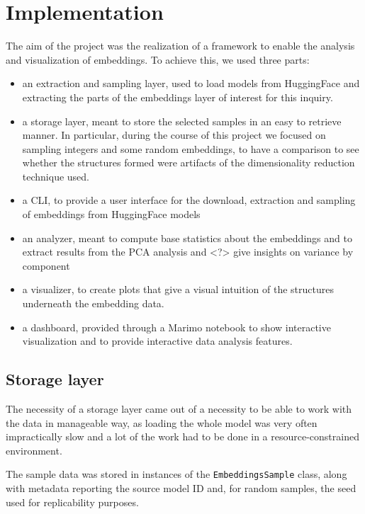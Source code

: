 \documentclass[
  a4paper, twoside, 10pt, titlepage]{book}
\begin{document}
\chapter{Implementation}\label{implementation}

The aim of the project was the realization of a framework to enable the
analysis and visualization of embeddings. To achieve this, we used three
parts:

\begin{itemize}
\item
  an extraction and sampling layer, used to load models from HuggingFace
  and extracting the parts of the embeddings layer of interest for this
  inquiry.
\item
  a storage layer, meant to store the selected samples in an easy to
  retrieve manner. In particular, during the course of this project we
  focused on sampling integers and some random embeddings, to have a
  comparison to see whether the structures formed were artifacts of the
  dimensionality reduction technique used.
\item
  a CLI, to provide a user interface for the download, extraction and
  sampling of embeddings from HuggingFace models
\item
  an analyzer, meant to compute base statistics about the embeddings and
  to extract results from the PCA analysis and \textless?\textgreater{}
  give insights on variance by component
\item
  a visualizer, to create plots that give a visual intuition of the
  structures underneath the embedding data.
\item
  a dashboard, provided through a Marimo notebook to show interactive
  visualization and to provide interactive data analysis features.
\end{itemize}

\section{Storage layer}\label{storage-layer}

The necessity of a storage layer came out of a necessity to be able to
work with the data in manageable way, as loading the whole model was
very often impractically slow and a lot of the work had to be done in a
resource-constrained environment.

The sample data was stored in instances of the \texttt{EmbeddingsSample}
class, along with metadata reporting the source model ID and, for random
samples, the seed used for replicability purposes.
\end{document}
